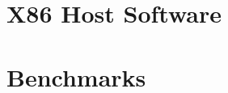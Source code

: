 \documentclass[12pt]{article}
\begin{document}


\section{X86 Host Software}\label{sec:sw}


\section{Benchmarks}\label{sec:bench}
\end{document}
